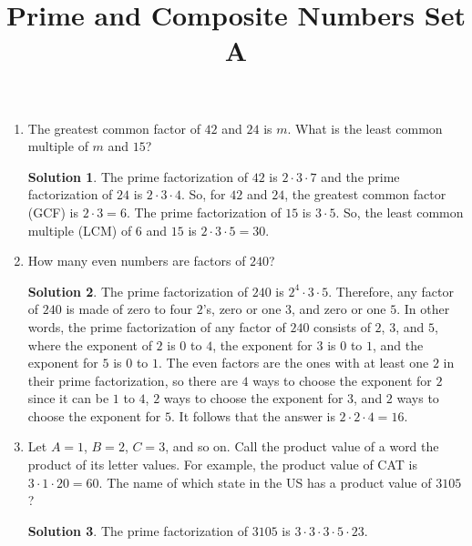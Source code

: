 \documentclass{article}
\title{Prime and Composite Numbers Set A}
\date{}
\author{}
\theoremstyle{definition}
\newtheorem*{solution}{Solution}
\begin{document}
\maketitle
\begin{multicols}{2}
    \begin{enumerate}
        \item The greatest common factor of $42$ and $24$ is $m$.
            What is the least common multiple of $m$ and $15$?
            \begin{solution}
                The prime factorization of $42$ is $2 \cdot 3 \cdot 7$ and the prime factorization
                of $24$ is $2 \cdot 3 \cdot 4$.
                So, for $42$ and $24$, the greatest common factor (GCF) is $2 \cdot 3 = 6$.
                The prime factorization of $15$ is $3 \cdot 5$.
                So, the least common multiple (LCM) of $6$ and $15$ is $2 \cdot 3 \cdot 5 =
                \boxed{30}$.
            \end{solution}
        \item How many even numbers are factors of $240$?
            \begin{solution}
                The prime factorization of $240$ is $2^4 \cdot 3 \cdot 5$.
                Therefore, any factor of $240$ is made of zero to four $2$'s, zero or one $3$, and
                zero or one $5$.
                In other words, the prime factorization of any factor of $240$ consists of
                $2$, $3$, and $5$, where the exponent of $2$ is $0$ to $4$, the exponent for $3$
                is $0$ to $1$, and the exponent for $5$ is $0$ to $1$.
                The even factors are the ones with at least one $2$ in their prime factorization,
                so there are $4$ ways to choose the exponent for $2$ since it can be $1$ to $4$,
                $2$ ways to choose the exponent for $3$,
                and $2$ ways to choose the exponent for $5$.
                It follows that the answer is $2 \cdot 2 \cdot 4 = \boxed{16}$.
            \end{solution}
        \item Let $A = 1$, $B = 2$, $C = 3$, and so on.
            Call the product value of a word the product of its letter values.
            For example, the product value of CAT is $3 \cdot 1 \cdot 20 = 60$.
            The name of which state in the US has a product value of $3105$?
            \begin{solution}
                The prime factorization of $3105$ is $3 \cdot 3 \cdot 3 \cdot 5 \cdot 23$.

\end{solution}
\end{enumerate}
\end{multicols}
\end{document}
